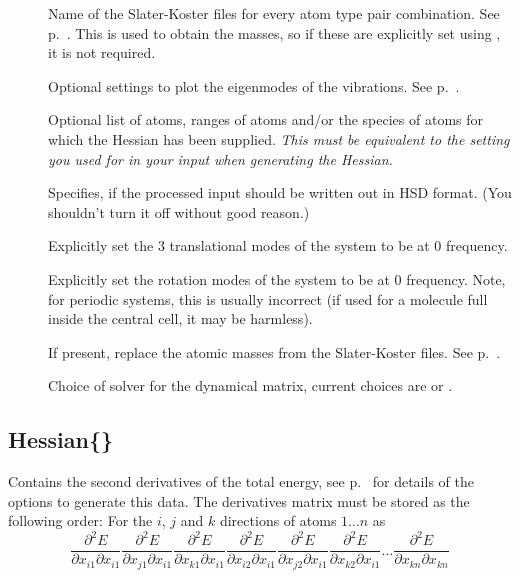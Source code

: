 \begin{description}
\item[] Name of the Slater-Koster files for
  every atom type pair combination. See
  p.~. This is used to obtain the
  masses, so if these are explicitly set using , it is
  not required.
\item[] Optional settings to plot the eigenmodes of the
  vibrations. See p.~.
\item[] Optional list of atoms, ranges of atoms and/or the species of
  atoms for which the Hessian has been supplied. \emph{This must be equivalent
    to the setting you used for  in your \dftbp{} input when
    generating the Hessian.}
\item[] Specifies, if the processed input should be written
  out in HSD format. (You shouldn't turn it off without good reason.)
\item[] Explicitly set the 3 translational modes of the
  system to be at 0 frequency.
\item[] Explicitly set the rotation modes of the system to be
  at 0 frequency. Note, for periodic systems, this is usually incorrect (if used
  for a molecule full inside the central cell, it may be harmless).
\item[] If present, replace the atomic masses from the
  Slater-Koster files. See p.~.
\item[] Choice of solver for the dynamical matrix,
  current choices are  or .
\end{description}


\subsection{Hessian\{\}}
\label{sec:modes.Hessian}

Contains the second derivatives of the total energy,
see p.~ for details of the \dftbp{}
options to generate this data. The derivatives matrix must be stored
as the following order: For the $i$, $j$ and $k$ directions of atoms
$1 \ldots n$ as
\begin{equation*}
  \frac{\partial^2 E}{\partial x_{i1} \partial x_{i1}} \frac{\partial^2
    E}{\partial x_{j1} \partial x_{i1}} \frac{\partial^2 E}{\partial x_{k1}
    \partial x_{i1}} \frac{\partial^2 E}{\partial x_{i2} \partial x_{i1}}
  \frac{\partial^2 E}{\partial x_{j2} \partial x_{i1}} \frac{\partial^2
    E}{\partial x_{k2} \partial x_{i1}} \ldots \frac{\partial^2 E}{\partial
    x_{kn} \partial x_{kn}}
\end{equation*}

